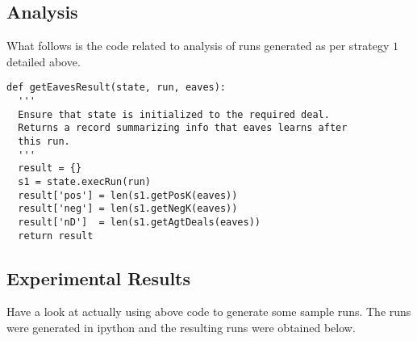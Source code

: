 \subsection{Analysis}
\label{apdx:s1Analysis}

What follows is the code related to analysis of
runs generated as per strategy $1$ detailed above.

\begin{verbatim}
def getEavesResult(state, run, eaves):
  '''
  Ensure that state is initialized to the required deal.
  Returns a record summarizing info that eaves learns after
  this run.
  '''
  result = {}
  s1 = state.execRun(run)
  result['pos'] = len(s1.getPosK(eaves))
  result['neg'] = len(s1.getNegK(eaves))
  result['nD']  = len(s1.getAgtDeals(eaves))
  return result
\end{verbatim}

\subsection{Experimental Results}
\label{appdx:exec}

Have a look at actually using above code to generate
some sample runs. The runs were generated in ipython
and the resulting runs were obtained below.



